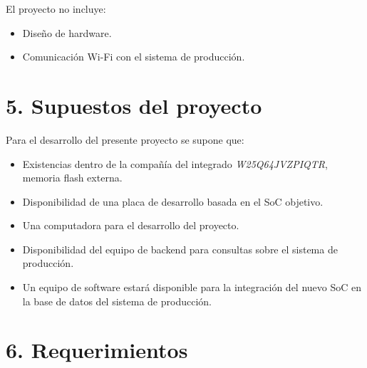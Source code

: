 \documentclass[
11pt, %
]{charter}
\begin{document}
El proyecto no incluye:
\begin{itemize}
	\item Diseño de hardware.
	\item Comunicación Wi-Fi con el sistema de producción.
\end{itemize}

\section{5. Supuestos del proyecto}
\label{sec:supuestos}

Para el desarrollo del presente proyecto se supone que:

\begin{itemize}
	\item Existencias dentro de la compañía del integrado \textit{W25Q64JVZPIQTR}, memoria flash externa.
	\item Disponibilidad de una placa de desarrollo basada en el SoC objetivo.
	\item Una computadora para el desarrollo del proyecto.
	\item Disponibilidad del equipo de backend para consultas sobre el sistema de producción.
	\item Un equipo de software estará disponible para la integración del nuevo SoC en la base de datos del sistema de producción.
\end{itemize}

\section{6. Requerimientos}
\label{sec:requerimientos}
\end{document}
